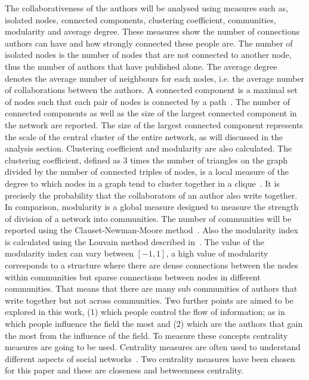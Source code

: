 \documentclass{article}
\theoremstyle{definition}
\begin{document}
The collaborativeness of the authors will be analysed using measures such as, isolated nodes,
connected components, clustering coefficient, communities, modularity and average degree.
These measures show the number of connections authors can have
and how strongly connected these people are. The number of isolated nodes is the
number of nodes that are not connected to another node, thus the
number of authors that have published alone. The average degree denotes the average
number of neighbours for each nodes, i.e. the average number of collaborations
between the authors.
A connected component is a maximal set of nodes such that each pair of nodes is
connected by a path~\cite{Easley2010}. The number of connected components as well as the size of the
largest connected component in the network are reported.
The size of the largest connected component represents the scale of the central cluster
of the entire network, as will discussed in the analysis section.
Clustering coefficient and modularity are also calculated. The clustering
coefficient, defined as 3 times the number of triangles on the graph divided
by the number of connected triples of nodes, is a local measure of the degree to
which nodes in a graph tend to cluster together
in a clique~\cite{Easley2010}. It is precisely the probability that the collaborators
of an author also write together.
In comparison, modularity is a global measure designed to measure the strength of
division of a network into communities. The number of communities will be reported
using the Clauset-Newman-Moore method~\cite{clauset2004}. Also the modularity index
is calculated using the Louvain method described in~\cite{Blondel2008}. The value
of the modularity index can vary between \([-1, 1]\), a high value of modularity
corresponds to a structure where there are dense connections between the nodes within
communities but sparse connections between nodes in different communities.
That means that there are many sub communities of authors that write together
but not across communities.
Two further points are aimed to be explored in this work, (1) which people control the flow
of information;
as in which people influence the field the most and (2) which are the authors that
gain the most from the influence of the field. To measure these concepts
centrality measures are going to be used.
Centrality measures are often used to understand different
aspects of social networks~\cite{Landherr2010}. Two centrality measures have been
chosen for this paper and these are closeness and betweenness centrality.
\end{document}
